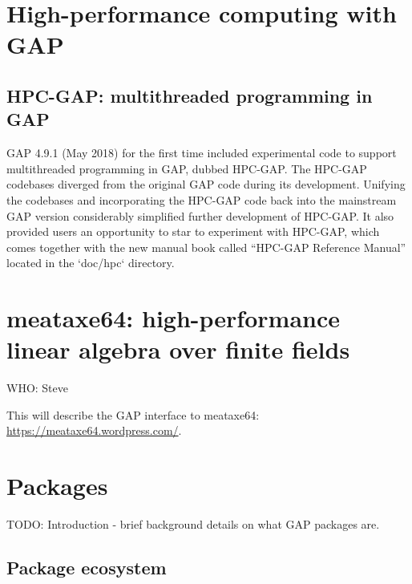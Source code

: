 \documentclass{deliverablereport}
\begin{document}
\section{High-performance computing with GAP}

\subsection{HPC-GAP: multithreaded programming in GAP}\label{hpc-gap}

GAP 4.9.1 (May 2018) for the first time included experimental code to 
support multithreaded programming in GAP, dubbed HPC-GAP. The HPC-GAP 
codebases diverged from the original GAP code during its development. 
Unifying the codebases and incorporating the HPC-GAP code back into the 
mainstream GAP version considerably simplified further development of 
HPC-GAP. It also provided users an opportunity to star to experiment 
with HPC-GAP, which comes together with the new manual book called 
``HPC-GAP Reference Manual'' located in the `doc/hpc` directory.




\section{meataxe64: high-performance linear algebra over finite fields}

WHO: Steve

This will describe the GAP interface to meataxe64: \url{https://meataxe64.wordpress.com/}.


\section{Packages}

TODO: Introduction - brief background details on what GAP packages are.

\subsection{Package ecosystem}
\end{document}
